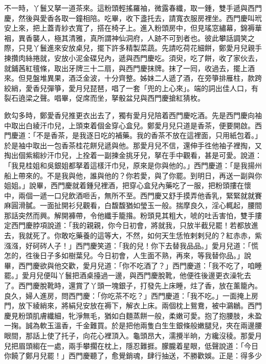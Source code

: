 不一時，丫鬟又拏一道茶來。這粉頭輕搖羅袖，微露春纖，取一鍾，雙手遞與西門慶，然後與愛香各取一鐘相陪。吃畢，收下盞托去，請寬衣服房裡坐。西門慶叫玳安上來，把上蓋青紗衣寬了，搭在椅子上。{}進入粉頭房中，但見瑤窓繡幕，錦褥華裀，異香襲人，極其清雅，真所謂神仙洞府，人跡不可到者也。彼此攀話調笑之際，只見丫鬟進來安放桌兒，擺下許多精製菜蔬。先請吃荷花細餅，鄭愛月兒親手揀攢肉絲捲就，安放小泥金碟兒內，遞與西門慶吃。須臾，吃了餅，收了家伙去，就鋪茜紅氊條，取出牙牌三十二扇，與西門慶抹牌。抹了一囘，收過去，擺上酒來。但見盤堆異果，酒泛金波，十分齊整。姊妹二人遞了酒，在旁箏排雁柱，款跨絞綃，愛香兒彈箏，愛月兒琵琶，唱了一套「兜的上心來」。{}端的詞出佳人口，有裂石遶梁之聲。唱畢，促席而坐，拏骰盆兒與西門慶搶紅猜枚。

飲勾多時，鄭愛香兒推更衣出去了，獨有愛月兒陪着西門慶吃酒。先是西門慶向袖中取出白綾汗巾兒，上頭束着個金穿心盒兒。鄭愛月兒只道是香茶，便要開啟。西門慶道：「不是香茶，是我逐日吃的補藥。{}我的香茶不放在這裡面，只用紙包着。」於是袖中取出一包香茶桂花餅兒遞與他。那愛月兒不信，還伸手徃他袖子裡掏，又掏出個紫縐紗汗巾兒，上拴着一副揀金挑牙兒，拏在手中觀看，甚是可愛。說道：「我見桂姐和吳銀姐都拏着這樣汗巾兒，原來是你與他的。」西門慶道：「是我揚州船上帶來的。不是我與他，誰與他的？你若愛，與了你罷。到明日，再送一副與你姐姐。」說畢，西門慶就着鍾兒裡酒，把穿心盒兒內藥吃了一服，把粉頭摟在懷中，兩個一遞一口兒飲酒咂舌，無所不至。西門慶又舒手摸弄他香乳，緊緊就就賽麻圓滑膩。一面扯開衫兒觀看，白馥馥猶如瑩玉一般。揣摩良久，淫心輒起，腰間那話突然而興。解開褲帶，令他纖手籠揝。粉頭見其粗大，唬的吐舌害怕，雙手摟定西門慶脖項說道：「我的親親，你今日初會，將就我，只放半截兒罷！若都放進去，我就死了。你敢吃藥養的這等大，不然，如何天生恁恠剌剌兒的？紅赤赤，紫漒漒，好砢硶人子！」西門慶笑道：「我的兒！你下去替我品品。」愛月兒道：「慌怎的，徃後日子多如樹葉兒。今日初會，人生面不熟，再來，等我替你品。」說畢，西門慶欲與他交歡，愛月兒道：「你不吃酒了？」西門慶道：「我不吃了，咱睡罷。」愛月兒便叫丫鬟把酒桌擡過一邊，與西門慶脫靴，他便徃後邊更衣澡牝去了。西門慶脫靴時，還賞了丫頭一塊銀子，打發先上床睡，炷了香，放在薰籠內。良久，婦人進房，問西門慶：「你吃茶不吃？」西門慶道：「我不吃。」{}一面掩上房門，放下綾綃來，將絹兒安放在褥下，解衣上床。兩個枕上鴛鴦，被中鸂鶒。西門慶見粉頭肌膚纖細，牝淨無毛，猶如白麵蒸餅一般，柔嫩可愛。抱了抱腰肢，未盈一掬。誠為軟玉溫香，千金難買。於是把他兩隻白生生銀條般嫩腿兒，夾在兩邊腰眼間，那話上使了托子，向花心裡頂入。龜頭昂大，濡攪半晌，方纔沒稜。那愛月兒把眉頭縐在一處，兩手攀擱在枕上，隱忍難捱。朦朧着星眼，低聲說道：「今日你饒了鄭月兒罷！」西門慶聽了，愈覺銷魂，肆行抽送，不勝歡娛。正是：得多少

